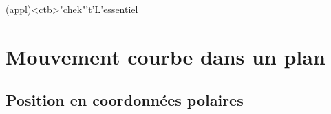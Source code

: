 \documentclass[../../main/main.tex]{subfiles}
\begin{document}
\vspace*{\fill}
\newpage
\vspace*{\fill}

\begin{tcn}[%
		sidebyside, fontupper=\small, fontlower=\small
	](appl)<ctb>"chek"'t'{L'essentiel}
	\tcblower
\end{tcn}

\vspace*{\fill}

\newpage

\section{Mouvement courbe dans un plan}
\subsection{Position en coordonnées polaires}
\end{document}
